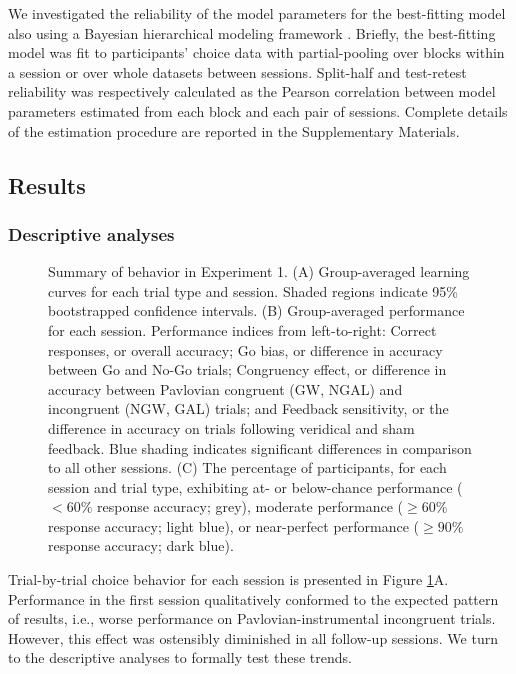 \documentclass[a4paper,12pt]{article}
\begin{document}
\begin{refsection}[main]
We investigated the reliability of the model parameters for the best-fitting model also using a Bayesian hierarchical modeling framework \cite{rouder2019psychometrics}. Briefly, the best-fitting model was fit to participants' choice data with partial-pooling over blocks within a session or over whole datasets between sessions. Split-half and test-retest reliability was respectively calculated as the Pearson correlation between model parameters estimated from each block and each pair of sessions. Complete details of the estimation procedure are reported in the Supplementary Materials.

\subsection*{Results}

\subsubsection*{Descriptive analyses}

\begin{figure}[hpt]
    \centerline{}
    \caption{Summary of behavior in Experiment 1. (A) Group-averaged learning curves for each trial type and session. Shaded regions indicate 95\% bootstrapped confidence intervals. (B) Group-averaged performance for each session. Performance indices from left-to-right: Correct responses, or overall accuracy; Go bias, or difference in accuracy between Go and No-Go trials; Congruency effect, or difference in accuracy between Pavlovian congruent (GW, NGAL) and incongruent (NGW, GAL) trials; and Feedback sensitivity, or the difference in accuracy on trials following veridical and sham feedback. Blue shading indicates significant differences in comparison to all other sessions. (C) The percentage of participants, for each session and trial type, exhibiting at- or below-chance performance ($< 60\%$ response accuracy; grey), moderate performance ($\geq 60\%$ response accuracy; light blue), or near-perfect performance ($\geq 90\%$ response accuracy; dark blue).}
    \label{fig:exp01_behavior}
\end{figure}

Trial-by-trial choice behavior for each session is presented in Figure \ref{fig:exp01_behavior}A. Performance in the first session qualitatively conformed to the expected pattern of results, i.e., worse performance on Pavlovian-instrumental incongruent trials. However, this effect was ostensibly diminished in all follow-up sessions. We turn to the descriptive analyses to formally test these trends. 


\end{refsection}
\end{document}
